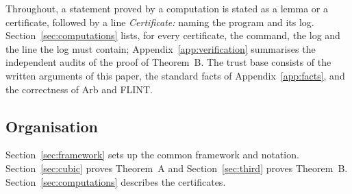 Throughout, a statement proved by a computation is stated as a lemma or a certificate, followed by a line
\emph{Certificate:} naming the program and its log. Section~\ref{sec:computations} lists, for every certificate, the
command, the log and the line the log must contain; Appendix~\ref{app:verification} summarises the independent audits of the
proof of Theorem~B. The trust base consists of the written arguments of this paper, the standard facts of
Appendix~\ref{app:facts}, and the correctness of Arb and FLINT.

\subsection{Organisation}
Section~\ref{sec:framework} sets up the common framework and notation. Section~\ref{sec:cubic} proves Theorem~A and
Section~\ref{sec:third} proves Theorem~B. Section~\ref{sec:computations} describes the certificates.
